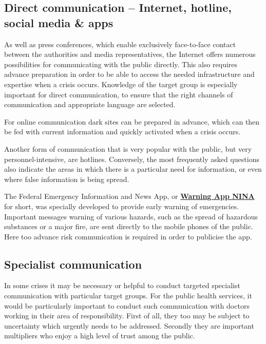 \documentclass{article}
\begin{document}
\subsection{Direct communication – Internet, hotline, social media \& apps}\label{H4511224}



As well as press conferences, which enable exclusively face-to-face contact between the authorities and media representatives, the Internet offers numerous possibilities for communicating with the public directly. This also requires advance preparation in order to be able to access the needed infrastructure and expertise when a crisis occurs. Knowledge of the target group is especially important for direct communication, to ensure that the right channels of communication and appropriate language are selected.


For online communication dark sites can be prepared in advance, which can then be fed with current information and quickly activated when a crisis occurs.


Another form of communication that is very popular with the public, but very personnel-intensive, are hotlines. Conversely, the most frequently asked questions also indicate the areas in which there is a particular need for information, or even where false information is being spread.


The Federal Emergency Information and News App, or \textbf{\href{https://www.bbk.bund.de/DE/NINA/Warn-App_NINA.html}{Warning App NINA}} for short, was specially developed to provide early warning of emergencies. Important messages warning of various hazards, such as the spread of hazardous substances or a major fire, are sent directly to the mobile phones of the public. Here too advance risk communication is required in order to publicise the app.


\subsection{Specialist communication}\label{H7417663}



In some crises it may be necessary or helpful to conduct targeted specialist communication with particular target groups. For the public health services, it would be particularly important to conduct such communication with doctors working in their area of responsibility. First of all, they too may be subject to uncertainty which urgently needs to be addressed. Secondly they are important multipliers who enjoy a high level of trust among the public.
\end{document}
